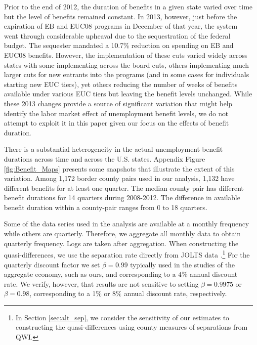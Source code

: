 \documentclass[12pt]{article}
\newcommand{\1}{\mathbf{1}}
\begin{document}
Prior to the end of 2012, the duration of benefits in a given state varied over time but the level of benefits remained constant. In 2013, however, just before the  expiration of EB and EUC08 programs in December of that year, the system went through considerable upheaval due to the sequestration of the federal budget. The sequester mandated a 10.7\% reduction on spending on EB and EUC08 benefits. However, the implementation of these cuts varied widely across states with some implementing across the board cuts, others implementing much larger cuts for new entrants into the programs (and in some cases for individuals starting new EUC tiers), yet others reducing the number of weeks of benefits available under various EUC tiers but leaving the benefit levels unchanged. While these 2013 changes provide a source of significant variation that might help identify the labor market effect of unemployment benefit levels, we do not attempt to exploit it in this paper given our focus on the effects of benefit duration.

There is a substantial heterogeneity in the actual unemployment benefit durations across time and across the U.S. states. Appendix Figure \ref{fig:Benefit_Maps} presents some snapshots that illustrate the extent of this variation. Among 1,172 border county pairs used in our analysis,  1,132 have different benefits for at least one quarter. The median county pair has different benefit durations for 14 quarters during 2008-2012. The difference in available benefit duration within a county-pair ranges from 0 to 18 quarters.

Some of the data series used in the analysis are available at a monthly frequency while others are quarterly. Therefore, we aggregate all monthly data to obtain quarterly frequency.  Logs are taken after aggregation. When constructing the quasi-differences, we use the separation rate directly from JOLTS data \citep{data:bls-jolts}.\footnote{In Section \ref{sec:alt_sep}, we consider the sensitivity of our estimates to constructing the quasi-differences using county measures of separations from QWI.}  For the quarterly discount factor we set $\beta = 0.99$ typically used in the studies of the aggregate economy, such as ours, and corresponding to a $4\%$ annual discount rate. We verify, however, that results are not sensitive to setting $\beta = 0.9975$ or $\beta = 0.98$, corresponding to a 1\% or 8\% annual discount rate, respectively.

\end{document}
